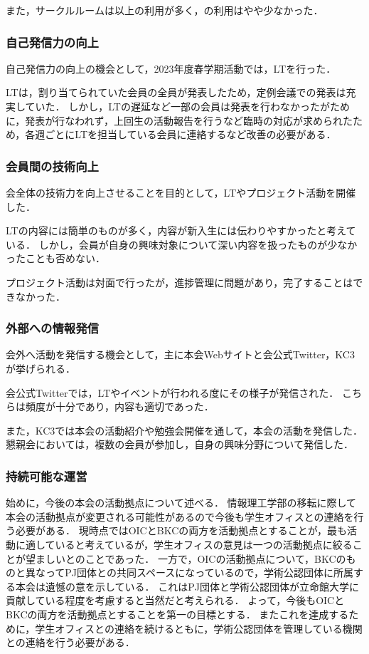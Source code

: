 また，サークルルームは\secondGrade{}以上の利用が多く，\firstGrade{}の利用はやや少なかった．

\subsubsection*{自己発信力の向上}
自己発信力の向上の機会として，2023年度春学期活動では，LTを行った．

LTは，割り当てられていた会員の全員が発表したため，定例会議での発表は充実していた．
しかし，LTの遅延など一部の会員は発表を行わなかったがために，発表が行なわれず，上回生の活動報告を行うなど臨時の対応が求められたため，各週ごとにLTを担当している会員に連絡するなど改善の必要がある．

\subsubsection*{会員間の技術向上}
会全体の技術力を向上させることを目的として，LTやプロジェクト活動を開催した．

LTの内容には簡単のものが多く，内容が新入生には伝わりやすかったと考えている．
しかし，会員が自身の興味対象について深い内容を扱ったものが少なかったことも否めない．

プロジェクト活動は対面で行ったが，進捗管理に問題があり，完了することはできなかった．

\subsubsection*{外部への情報発信}
会外へ活動を発信する機会として，主に本会Webサイトと会公式Twitter，KC3が挙げられる．

会公式Twitterでは，LTやイベントが行われる度にその様子が発信された．
こちらは頻度が十分であり，内容も適切であった．

また，KC3では本会の活動紹介や勉強会開催を通して，本会の活動を発信した．
懇親会においては，複数の会員が参加し，自身の興味分野について発信した．

\subsubsection*{持続可能な運営}
始めに，今後の本会の活動拠点について述べる．
情報理工学部の移転に際して本会の活動拠点が変更される可能性があるので今後も学生オフィスとの連絡を行う必要がある．
現時点ではOICとBKCの両方を活動拠点とすることが，最も活動に適していると考えているが，学生オフィスの意見は一つの活動拠点に絞ることが望ましいとのことであった．
一方で，OICの活動拠点について，BKCのものと異なってPJ団体との共同スペースになっているので，学術公認団体に所属する本会は遺憾の意を示している．
これはPJ団体と学術公認団体が立命館大学に貢献している程度を考慮すると当然だと考えられる．
よって，今後もOICとBKCの両方を活動拠点とすることを第一の目標とする．
またこれを達成するために，学生オフィスとの連絡を続けるともに，学術公認団体を管理している機関との連絡を行う必要がある．

